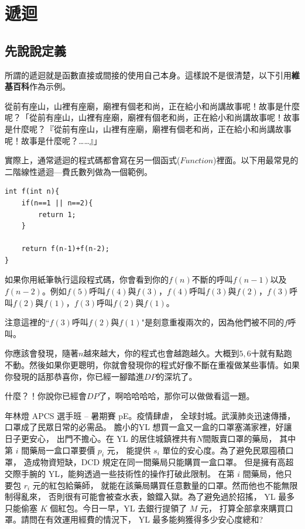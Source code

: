 \section{遞迴}
    \subsection{先說說定義}
    所謂的遞迴就是函數直接或間接的使用自己本身。這樣說不是很清楚，以下引用\textbf{維基百科}作為示例。

    \begin{quoting}
        從前有座山，山裡有座廟，廟裡有個老和尚，正在給小和尚講故事呢！故事是什麼呢？「從前有座山，山裡有座廟，廟裡有個老和尚，正在給小和尚講故事呢！故事是什麼呢？『從前有座山，山裡有座廟，廟裡有個老和尚，正在給小和尚講故事呢！故事是什麼呢？……』」
    \end{quoting}

    實際上，通常遞迴的程式碼都會寫在另一個函式($Function$)裡面。以下用最常見的二階線性遞迴—費氏數列做為一個範例。

    \begin{lstlisting}[caption=費氏數列的範例]
int f(int n){
    if(n==1 || n==2){
        return 1;
    }
    
    return f(n-1)+f(n-2);
}\end{lstlisting}

    如果你用紙筆執行這段程式碼，你會看到你的$f(n)$不斷的呼叫$f(n-1)$以及$f(n-2)$。例如$f(5)$呼叫$f(4)$與$f(3)$，$f(4)$呼叫$f(3)$與$f(2)$，$f(3)$呼叫$f(2)$與$f(1)$，$f(3)$呼叫$f(2)$與$f(1)$。

    注意這裡的``$f(3)$呼叫$f(2)$與$f(1)$"是刻意重複兩次的，因為他們被不同的$f$呼叫。

    你應該會發現，隨著$n$越來越大，你的程式也會越跑越久。大概到$5,6$十就有點跑不動。然後如果你更聰明，你就會發現你的程式好像不斷在重複做某些事情。如果你發現的話那恭喜你，你已經一腳踏進$DP$的深坑了。

    什麼？！你說你已經會$DP$了，啊哈哈哈哈，那你可以做做看這一題。

     年林燈 APCS 選手班 – 暑期賽 pE。疫情肆虐，
    全球封城。武漢肺炎迅速傳播，口罩成了民眾日常的必需品。
    膽小的YL 想買一盒又一盒的口罩塞滿家裡，好讓日子更安心，
    出門不擔心。在 YL 的居住城鎮裡共有$N$間販賣口罩的藥局，
    其中第 $i$ 間藥局一盒口罩要價 $p_i$ 元，
    能提供 $s_i$ 單位的安心度。為了避免民眾囤積口罩，
    造成物資短缺，DCD 規定在同一間藥局只能購買一盒口罩。
    但是擁有高超交際手腕的 YL，能夠透過一些技術性的操作打破此限制。
    在第 $i$ 間藥局，他只要包 $r_i$ 元的紅包給藥師，
    就能在該藥局購買任意數量的口罩。然而他也不能無限制得亂來，
    否則很有可能會被查水表，鋃鐺入獄。為了避免過於招搖，
    YL 最多只能偷塞 $K$ 個紅包。今日一早，YL 去銀行提領了 $M$ 元，
    打算全部拿來購買口罩。請問在有效運用經費的情況下，
    YL 最多能夠獲得多少安心度總和?

